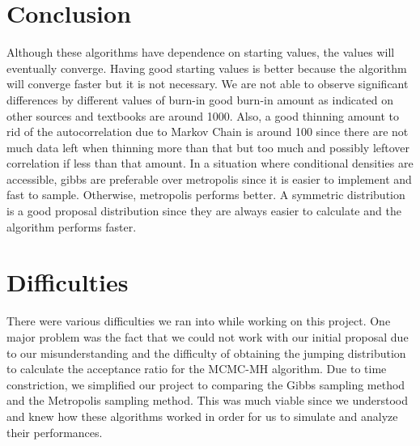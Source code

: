 \documentclass[11pt,a4paper]{article}
\begin{document}
\section*{Conclusion}
Although these algorithms have dependence on starting values, the values will eventually converge. Having good starting values is better because the algorithm will converge faster but it is not necessary. We are not able to observe significant differences by different values of burn-in good burn-in amount as indicated on other sources and textbooks are around 1000. Also, a good thinning amount to rid of the autocorrelation due to Markov Chain is around 100 since there are not much data left when thinning more than that but too much and possibly leftover correlation if less than that amount. In a situation where conditional densities are accessible, gibbs are preferable over metropolis since it is easier to implement and fast to sample. Otherwise, metropolis performs better. A symmetric distribution is a good proposal distribution since they are always easier to calculate and the algorithm performs faster. 


\section*{Difficulties}
There were various difficulties we ran into while working on this project. One major problem was the fact that we could not work with our initial proposal due to our misunderstanding and the difficulty of obtaining the jumping distribution to calculate the acceptance ratio for the MCMC-MH algorithm. Due to time constriction, we simplified our project to comparing the Gibbs sampling method and the Metropolis sampling method. This was much viable since we understood and knew how these algorithms worked in order for us to simulate and analyze their performances. 


\newpage
\end{document}
